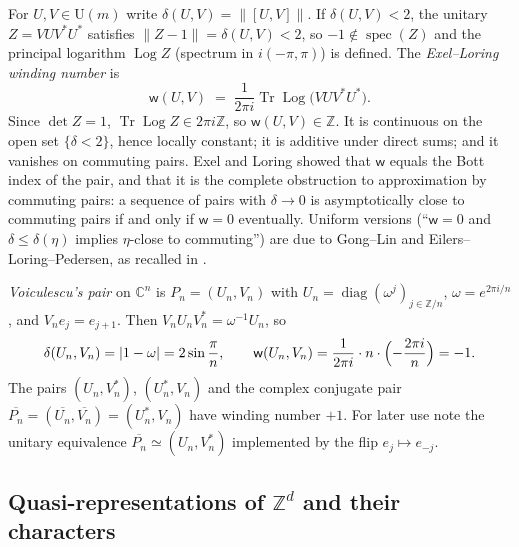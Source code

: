 \documentclass[11pt]{amsart}
\theoremstyle{definition}
\theoremstyle{remark}
\newcommand{\Z}{\mathbb Z}
\newcommand{\C}{\mathbb C}
\newcommand{\Tr}{\operatorname{Tr}}
\newcommand{\Log}{\operatorname{Log}}
\newcommand{\wind}{\mathsf w}
\newcommand{\U}{\mathrm U}
\newcommand{\norm}[1]{\lVert #1\rVert}
\begin{document}
For $U,V\in\U(m)$ write $\delta(U,V)=\norm{[U,V]}$. If $\delta(U,V)<2$, the unitary $Z=VUV^*U^*$ satisfies $\norm{Z-1}=\delta(U,V)<2$, so $-1\notin\operatorname{spec}(Z)$ and the principal logarithm $\Log Z$ (spectrum in $i(-\pi,\pi)$) is defined. The \emph{Exel--Loring winding number} is
\begin{equation}\label{eq:wind}
\wind(U,V)\;=\;\frac1{2\pi i}\Tr\Log\bigl(VUV^*U^*\bigr).
\end{equation}
Since $\det Z=1$, $\Tr\Log Z\in 2\pi i\Z$, so $\wind(U,V)\in\Z$. It is continuous on the open set $\{\delta<2\}$, hence locally constant; it is additive under direct sums; and it vanishes on commuting pairs. Exel and Loring \cite{EL89,EL91} showed that $\wind$ equals the Bott index of the pair, and that it is the complete obstruction to approximation by commuting pairs: a sequence of pairs with $\delta\to0$ is asymptotically close to commuting pairs if and only if $\wind=0$ eventually. Uniform versions (``$\wind=0$ and $\delta\le\delta(\eta)$ implies $\eta$-close to commuting'') are due to Gong--Lin and Eilers--Loring--Pedersen, as recalled in \cite{LS26}.

\emph{Voiculescu's pair} on $\C^n$ is $P_n=(U_n,V_n)$ with $U_n=\operatorname{diag}(\omega^j)_{j\in\Z/n}$, $\omega=e^{2\pi i/n}$, and $V_ne_j=e_{j+1}$. Then $V_nU_nV_n^*=\omega^{-1}U_n$, so
\begin{equation}\label{eq:voic}
\delta(U_n,V_n)=|1-\omega|=2\sin\frac\pi n,\qquad \wind(U_n,V_n)=\frac{1}{2\pi i}\cdot n\cdot\Bigl(-\frac{2\pi i}{n}\Bigr)=-1 .
\end{equation}
The pairs $(U_n,V_n^*)$, $(U_n^*,V_n)$ and the complex conjugate pair $\overline{P_n}=(\overline{U_n},\overline{V_n})=(U_n^*,V_n)$ have winding number $+1$. For later use note the unitary equivalence $\overline{P_n}\simeq(U_n,V_n^*)$ implemented by the flip $e_j\mapsto e_{-j}$.

\subsection{Quasi-representations of $\Z^{d}$ and their characters}\label{sec:characters}
\end{document}
